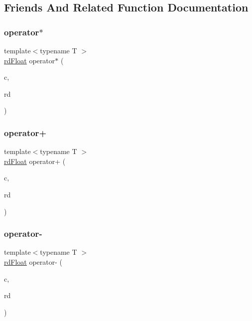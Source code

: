 \subsection{Friends And Related Function Documentation}
\mbox{\label{structrd_float_a1982068f976c88614485eb52693700ee}} 
\subsubsection{\texorpdfstring{operator$\ast$}{operator*}}
{\footnotesize\ttfamily template$<$typename T $>$ \\
\mbox{\hyperlink{structrd_float}{rd\+Float}} operator$\ast$ (\begin{DoxyParamCaption}\item[{T}]{c,  }\item[{const \mbox{\hyperlink{structrd_float}{rd\+Float}}$<$ T $>$ \&}]{rd }\end{DoxyParamCaption})\hspace{0.3cm}{\ttfamily [friend]}}

\mbox{\label{structrd_float_a743563bfbe34cc6999543f833a01dcba}} 
\subsubsection{\texorpdfstring{operator+}{operator+}}
{\footnotesize\ttfamily template$<$typename T $>$ \\
\mbox{\hyperlink{structrd_float}{rd\+Float}} operator+ (\begin{DoxyParamCaption}\item[{T}]{c,  }\item[{const \mbox{\hyperlink{structrd_float}{rd\+Float}}$<$ T $>$ \&}]{rd }\end{DoxyParamCaption})\hspace{0.3cm}{\ttfamily [friend]}}

\mbox{\label{structrd_float_a6b2bfc1de75db6222ffa169911e19865}} 
\subsubsection{\texorpdfstring{operator-\/}{operator-}}
{\footnotesize\ttfamily template$<$typename T $>$ \\
\mbox{\hyperlink{structrd_float}{rd\+Float}} operator-\/ (\begin{DoxyParamCaption}\item[{T}]{c,  }\item[{const \mbox{\hyperlink{structrd_float}{rd\+Float}}$<$ T $>$ \&}]{rd }\end{DoxyParamCaption})\hspace{0.3cm}{\ttfamily [friend]}}


